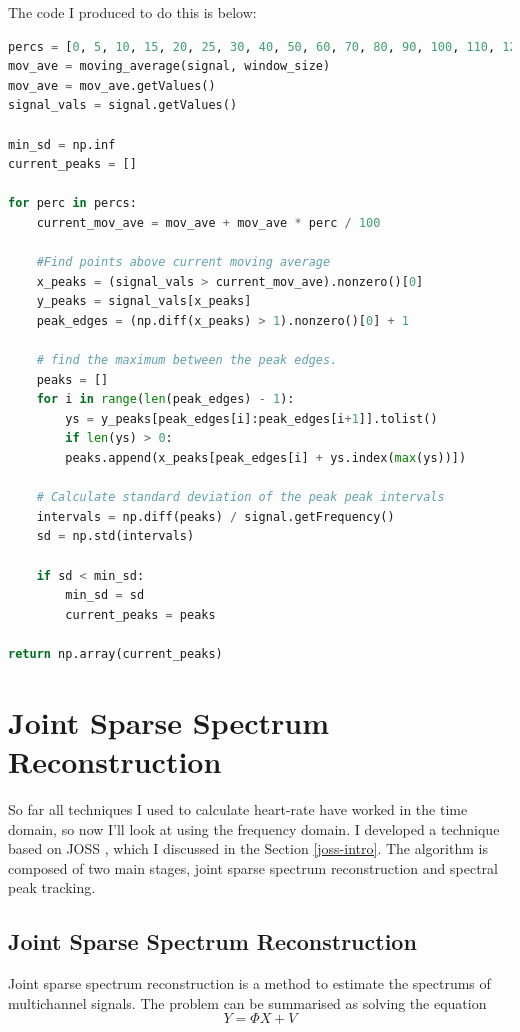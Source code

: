 \documentclass[12pt,a4paper,twoside,openright]{report}
\begin{document}
The code I produced to do this is below:
\begin{lstlisting}[language=Python]
percs = [0, 5, 10, 15, 20, 25, 30, 40, 50, 60, 70, 80, 90, 100, 110, 120, 150, 200, 300]
mov_ave = moving_average(signal, window_size)
mov_ave = mov_ave.getValues()
signal_vals = signal.getValues()

min_sd = np.inf
current_peaks = []

for perc in percs:
    current_mov_ave = mov_ave + mov_ave * perc / 100 
    
    #Find points above current moving average 
    x_peaks = (signal_vals > current_mov_ave).nonzero()[0]
    y_peaks = signal_vals[x_peaks]
    peak_edges = (np.diff(x_peaks) > 1).nonzero()[0] + 1 
    
    # find the maximum between the peak edges. 
    peaks = []
    for i in range(len(peak_edges) - 1): 
        ys = y_peaks[peak_edges[i]:peak_edges[i+1]].tolist()
        if len(ys) > 0:
    	peaks.append(x_peaks[peak_edges[i] + ys.index(max(ys))])
    
    # Calculate standard deviation of the peak peak intervals
    intervals = np.diff(peaks) / signal.getFrequency()
    sd = np.std(intervals)
    
    if sd < min_sd:
        min_sd = sd
        current_peaks = peaks

return np.array(current_peaks)

\end{lstlisting}

\section{Joint Sparse Spectrum Reconstruction}

So far all techniques I used to calculate heart-rate have worked in the time
domain, so now I'll look at using the frequency domain. I developed a
technique based on JOSS \cite{Zhang15.2}, which I discussed in the Section
\ref{joss-intro}. The algorithm is composed of two main stages, joint sparse
spectrum reconstruction and spectral peak tracking. 

\subsection{Joint Sparse Spectrum Reconstruction}

Joint sparse spectrum reconstruction is a method to estimate the spectrums of
multichannel signals. The problem can be summarised as solving the equation 
$$ Y = \Phi X + V $$
\end{document}
